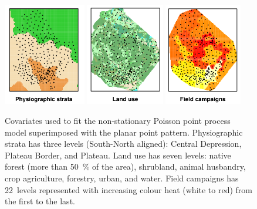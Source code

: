 \begin{figure}[!h]
 \centering
 \includegraphics[width=0.32\textwidth]{fig/chap06-covarsA}
 \includegraphics[width=0.305\textwidth]{fig/chap06-covarsB}
 \includegraphics[width=0.3\textwidth]{fig/chap06-covarsC}
 \caption{Covariates used to fit the non-stationary Poisson point process model superimposed with the planar 
 point pattern. Physiographic strata has three levels (South-North aligned): Central Depression, Plateau 
 Border, and Plateau. Land use has seven levels: native forest (more than \SI{50}{\percent} of the area), 
 shrubland, animal husbandry, crop agriculture, forestry, urban, and water. Field campaigns has
 \num{22}~levels represented with increasing colour heat (white to red) from the first to the last.}
 \label{fig:chap06-covars}
\end{figure}

